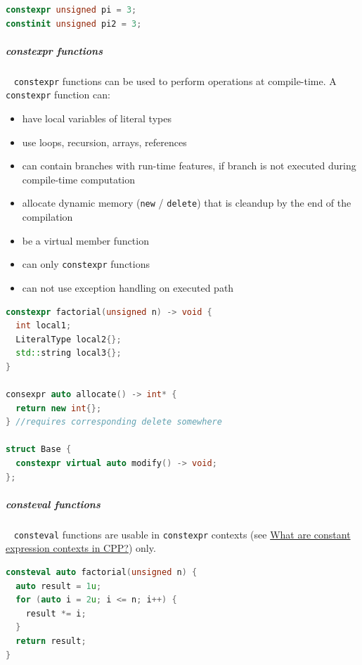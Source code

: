 \documentclass[11pt,twoside,landscape]{article}
\begin{document}
\begin{multicols}{2}
\begin{lstlisting}[language=c++,label=lst:constexpr-and-constinit-initialization,caption={constexpr and constinit initialization},captionpos=b,numbers=none]
constexpr unsigned pi = 3;
constinit unsigned pi2 = 3;
\end{lstlisting}

\subparagraph{constexpr functions} \
\label{sec:orgd8a0b5a}
\texttt{constexpr} functions can be used to perform operations at compile-time.
A \texttt{constexpr} function can:
\begin{itemize}
\item have local variables of literal types
\item use loops, recursion, arrays, references
\item can contain branches with run-time features, if branch is not executed during compile-time computation
\item allocate dynamic memory (\texttt{new} / \texttt{delete}) that is cleandup by the end of the compilation
\item be a virtual member function
\item can only \texttt{constexpr} functions
\item can not use exception handling on executed path
\end{itemize}


\begin{lstlisting}[language=c++,label=lst:examples-for-constexpr-function-usage,caption={Examples for constexpr function usage},captionpos=b,numbers=none]
constexpr factorial(unsigned n) -> void {
  int local1;
  LiteralType local2{};
  std::string local3{};
}

consexpr auto allocate() -> int* {
  return new int{};
} //requires corresponding delete somewhere

struct Base {
  constexpr virtual auto modify() -> void;
};
\end{lstlisting}

\subparagraph{consteval functions} \
\label{sec:org852b539}
\texttt{consteval} functions are usable in \texttt{constexpr} contexts (see \href{../../../roam/20230629094857-what_are_constant_expression_contexts_in_cpp.org}{What are constant expression contexts in CPP?}) only.

\begin{lstlisting}[language=c++,label=lst:consteval-example,caption={consteval example},captionpos=b,numbers=none]
consteval auto factorial(unsigned n) {
  auto result = 1u;
  for (auto i = 2u; i <= n; i++) {
    result *= i;
  }
  return result;
}


\end{lstlisting}
\end{multicols}
\end{document}
